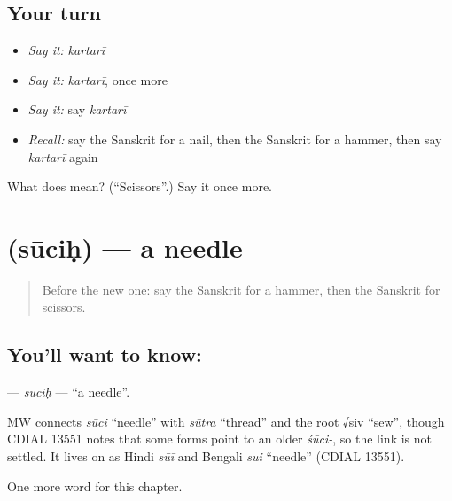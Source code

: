 \subsection*{Your turn}
\begin{itemize}
\raggedright
  \item \emph{Say it:} \emph{kartarī}
  \item \emph{Say it:} \emph{kartarī}, once more
  \item \emph{Say it:} say \emph{kartarī}
  \item \emph{Recall:} say the Sanskrit for a nail, then the Sanskrit for a hammer, then say \emph{kartarī} again
\end{itemize}

\begin{tcolorbox}[breakable,colback=teal!4,colframe=teal!35!black,title={Before you move on}]
What does  mean? (\textquotedblleft{}Scissors\textquotedblright{}.) Say it once more.
\end{tcolorbox}
\section[\texorpdfstring{\sk{सूचिः} (sūciḥ)}{सूचिः (sūciḥ)}]{ (sūciḥ) — a needle}

\label{lesson:SA-C100-sucih}



\begin{quote}
Before the new one: say the Sanskrit for a hammer, then the Sanskrit for scissors.
\end{quote}

\subsection*{You'll want to know: }
\textbf{} — \emph{sūciḥ} — \textquotedblleft{}a needle\textquotedblright{}.

\begin{cousinweb}
MW connects \emph{sūci} \textquotedblleft{}needle\textquotedblright{} with \emph{sūtra} \textquotedblleft{}thread\textquotedblright{} and the root √siv \textquotedblleft{}sew\textquotedblright{}, though CDIAL 13551 notes that some forms point to an older \emph{śūci-}, so the link is not settled. It lives on as Hindi \emph{sūī} and Bengali \emph{sui} \textquotedblleft{}needle\textquotedblright{} (CDIAL 13551).
\end{cousinweb}

\begin{grammarlens}[title={What you've built}]
One more word for this chapter.
\end{grammarlens}


